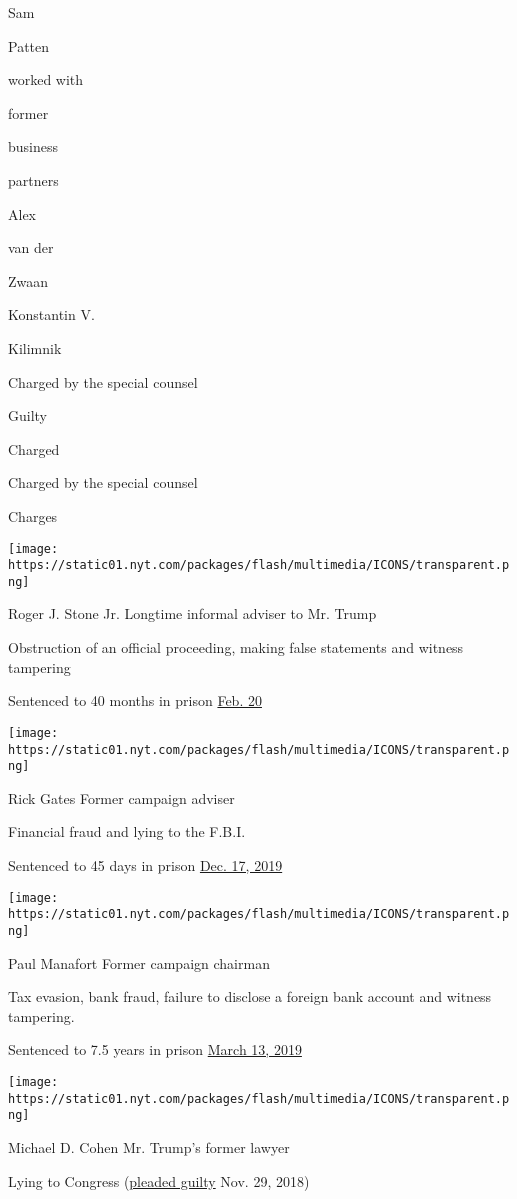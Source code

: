 Sam

Patten

worked with

former

business

partners

Alex

van der

Zwaan

Konstantin V.

Kilimnik

Charged by the special counsel

Guilty

Charged

Charged by the special counsel

Charges

\texttt{[image: https://static01.nyt.com/packages/flash/multimedia/ICONS/transparent.png]}

Roger J. Stone Jr. Longtime informal adviser to Mr. Trump

Obstruction of an official proceeding, making false statements and
witness tampering

Sentenced to 40 months in prison
\href{https://www.nytimes.com/2020/02/20/us/roger-stone-sentencing.html}{Feb.
20}

\texttt{[image: https://static01.nyt.com/packages/flash/multimedia/ICONS/transparent.png]}

Rick Gates Former campaign adviser

Financial fraud and lying to the F.B.I.

Sentenced to 45 days in prison
\href{https://www.nytimes.com/2019/12/17/us/politics/rick-gates-sentencing.html}{Dec.
17, 2019}

\texttt{[image: https://static01.nyt.com/packages/flash/multimedia/ICONS/transparent.png]}

Paul Manafort Former campaign chairman

Tax evasion, bank fraud, failure to disclose a foreign bank account and
witness tampering.

Sentenced to 7.5 years in prison
\href{https://www.nytimes.com/2019/03/13/us/politics/paul-manafort-sentencing.html}{March
13, 2019}

\texttt{[image: https://static01.nyt.com/packages/flash/multimedia/ICONS/transparent.png]}

Michael D. Cohen Mr. Trump's former lawyer

Lying to Congress
(\href{https://www.nytimes.com/2018/11/29/nyregion/michael-cohen-trump-russia-mueller.html}{pleaded
guilty} Nov. 29, 2018)

